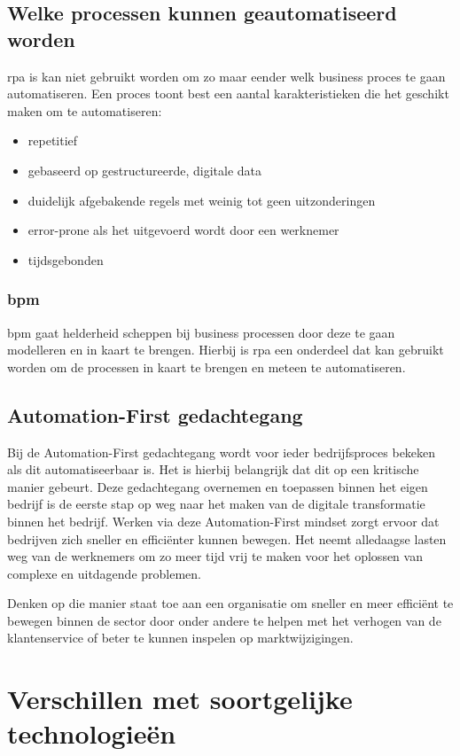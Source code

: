 \subsection{Welke processen kunnen geautomatiseerd worden}
\acrshort{rpa} is kan niet gebruikt worden om zo maar eender welk business proces te gaan automatiseren. Een proces toont best een aantal karakteristieken die het geschikt maken om te automatiseren:
\begin{itemize}
	\item repetitief
	\item gebaseerd op gestructureerde, digitale data
	\item duidelijk afgebakende regels met weinig tot geen uitzonderingen
	\item error-prone als het uitgevoerd wordt door een werknemer
	\item tijdsgebonden
\end{itemize}

\subsubsection{\acrlong{bpm}}
\acrfull{bpm} gaat helderheid scheppen bij business processen door deze te gaan modelleren en in kaart te brengen. Hierbij is \acrshort{rpa} een onderdeel dat kan gebruikt worden om de processen in kaart te brengen en meteen te automatiseren.
 

\subsection{Automation-First gedachtegang}
Bij de Automation-First gedachtegang wordt voor ieder bedrijfsproces bekeken als dit automatiseerbaar is. Het is hierbij belangrijk dat dit op een kritische manier gebeurt. Deze gedachtegang overnemen en toepassen binnen het eigen bedrijf is de eerste stap op weg naar het maken van de digitale transformatie binnen het bedrijf. Werken via deze Automation-First mindset zorgt ervoor dat bedrijven zich sneller en efficiënter kunnen bewegen. Het neemt alledaagse lasten weg van de werknemers om zo meer tijd vrij te maken voor het oplossen van complexe en uitdagende problemen.

Denken op die manier staat toe aan een organisatie om sneller en meer efficiënt te bewegen binnen de sector door onder andere te helpen met het verhogen van de klantenservice of beter te kunnen inspelen op marktwijzigingen.

\section{Verschillen met soortgelijke technologieën}

